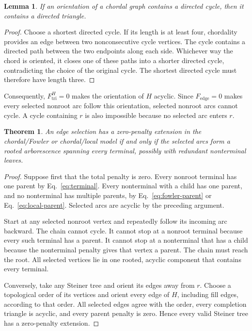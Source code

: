 \documentclass[10pt,a4paper]{article}
\newtheorem{theorem}{Theorem}
\newtheorem{lemma}{Lemma}
\begin{document}
\begin{lemma}
If an orientation of a chordal graph contains a directed cycle, then it
contains a directed triangle.
\end{lemma}

\begin{proof}
Choose a shortest directed cycle. If its length is at least four, chordality
provides an edge between two nonconsecutive cycle vertices. The cycle contains
a directed path between the two endpoints along each side. Whichever way the
chord is oriented, it closes one of these paths into a shorter directed cycle,
contradicting the choice of the original cycle. The shortest directed cycle
must therefore have length three.
\end{proof}

Consequently, $F_{\mathrm{tri}}^{H}=0$ makes the orientation of $H$ acyclic.
Since $F_{\mathrm{edge}}=0$ makes every selected nonroot arc follow this
orientation, selected nonroot arcs cannot cycle. A cycle containing $r$ is
also impossible because no selected arc enters $r$.

\begin{theorem}
An edge selection has a zero-penalty extension in the chordal/Fowler or
chordal/local model if and only if the selected arcs form a rooted
arborescence spanning every terminal, possibly with redundant nonterminal
leaves.
\end{theorem}

\begin{proof}
Suppose first that the total penalty is zero. Every nonroot terminal has one
parent by Eq.~\eqref{eq:terminal}. Every nonterminal with a child has one
parent, and no nonterminal has multiple parents, by
Eq.~\eqref{eq:fowler-parent} or Eq.~\eqref{eq:local-parent}. Selected arcs are
acyclic by the preceding argument.

Start at any selected nonroot vertex and repeatedly follow its incoming arc
backward. The chain cannot cycle. It cannot stop at a nonroot terminal because
every such terminal has a parent. It cannot stop at a nonterminal that has a
child because the nonterminal penalty gives that vertex a parent. The chain
must reach the root. All selected vertices lie in one rooted, acyclic component
that contains every terminal.

Conversely, take any Steiner tree and orient its edges away from $r$. Choose a
topological order of its vertices and orient every edge of $H$, including fill
edges, according to that order. All selected edges agree with the order, every
completion triangle is acyclic, and every parent penalty is zero. Hence every
valid Steiner tree has a zero-penalty extension.
\end{proof}
\end{document}
